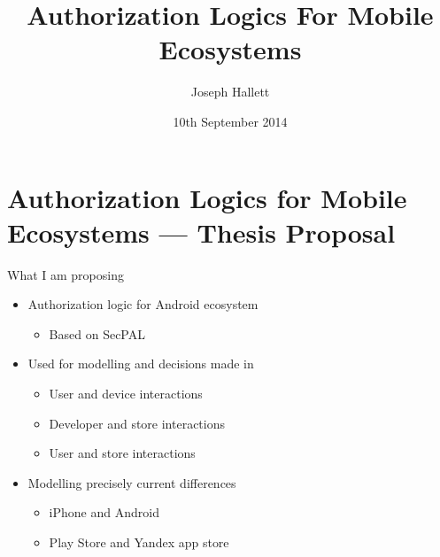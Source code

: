\documentclass[ignorenonframetext,]{beamer}
\title{Authorization Logics For Mobile Ecosystems}
\author{Joseph Hallett}
\date{10th September 2014}
\begin{document}
\frame{\titlepage}

\section{Authorization Logics for Mobile Ecosystems --- Thesis
Proposal}\label{authorization-logics-for-mobile-ecosystems-thesis-proposal}

\begin{frame}{What I am proposing}

\begin{itemize}
\itemsep1pt\parskip0pt
\item
  Authorization logic for Android ecosystem

  \begin{itemize}
  \itemsep1pt\parskip0pt
  \item
    Based on SecPAL
  \end{itemize}
\item
  Used for modelling and decisions made in

  \begin{itemize}
  \itemsep1pt\parskip0pt
  \item
    User and device interactions
  \item
    Developer and store interactions
  \item
    User and store interactions
  \end{itemize}
\item
  Modelling precisely current differences

  \begin{itemize}
  \itemsep1pt\parskip0pt
  \item
    iPhone and Android
  \item
    Play Store and Yandex app store
  \end{itemize}
\end{itemize}

\end{frame}
\end{document}
